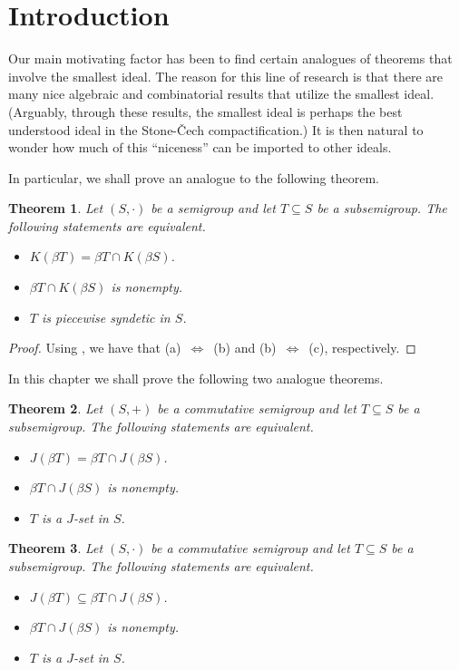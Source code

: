 \documentclass[12pt]{article}
\theoremstyle{plain}
\newtheorem{thm}{Theorem}[section]
\theoremstyle{definition}
\begin{document}
\section{Introduction}
Our main motivating factor has been to find certain analogues of
theorems that involve the smallest ideal.
The reason for this line of research is that there are many nice
algebraic and combinatorial results that utilize the smallest ideal. 
(Arguably, through these results, the smallest ideal is perhaps the
best understood ideal in the Stone-\v{C}ech compactification.)
It is then natural to wonder how much of this ``niceness'' can be
imported to other ideals.

In particular, we shall prove an analogue to the following theorem. 
\begin{thm}
  Let $(S,\cdot)$ be a semigroup and let $T \subseteq S$ be a
  subsemigroup. 
  The following statements are equivalent.
  \begin{itemize}
    \item[(a)] $K(\beta T) = \beta T \cap K(\beta S)$.
    \item[(b)] $\beta T \cap K(\beta S)$ is nonempty.
    \item[(c)] $T$ is piecewise syndetic in $S$.
  \end{itemize}
\end{thm}
\begin{proof}
  Using \cite[Theorems 1.65 and 4.40]{Hindman:1998fk}, we have that
  \mbox{(a) $\iff$ (b)} and \mbox{(b) $\iff$ (c)}, respectively. 
\end{proof}

In this chapter we shall prove the following two analogue theorems.
\begin{thm}
  Let $(S, +)$ be a commutative semigroup and let $T \subseteq S$ be a
  subsemigroup. 
  The following statements are equivalent.
  \begin{itemize}
    \item[(a)] $J(\beta T) = \beta T \cap J(\beta S)$.
    \item[(b)] $\beta T \cap J(\beta S)$ is nonempty.
    \item[(c)] $T$ is a $J$-set in $S$.
  \end{itemize}
\end{thm}

\begin{thm}
  Let $(S, \cdot)$ be a commutative semigroup and let $T \subseteq S$ be a
  subsemigroup. 
  The following statements are equivalent.
  \begin{itemize}
    \item[(a)] $J(\beta T) \subseteq \beta T \cap J(\beta S)$.
    \item[(b)] $\beta T \cap J(\beta S)$ is nonempty.
    \item[(c)] $T$ is a $J$-set in $S$.
  \end{itemize}
\end{thm}
\end{document}

